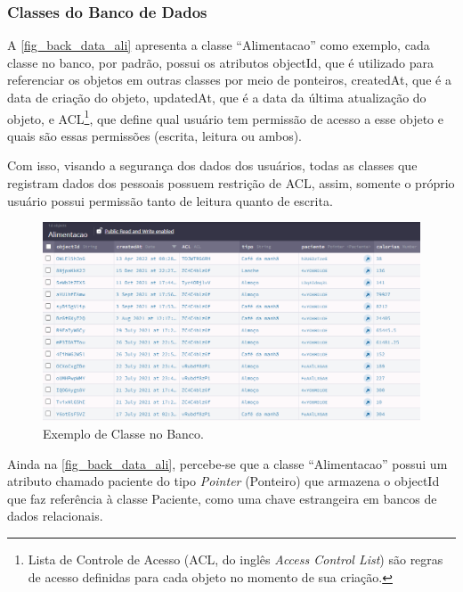 \subsubsection{Classes do Banco de Dados}

A \autoref{fig_back_data_ali} apresenta a classe ``Alimentacao'' como exemplo, cada classe no banco, por padrão,
possui os atributos objectId, que é utilizado para referenciar os objetos em outras classes por
meio de ponteiros, createdAt, que é a data de criação do objeto, updatedAt, que é a data da última atualização
do objeto, e ACL\footnote{Lista de Controle de Acesso (ACL, do inglês \emph{\textit{Access Control List}})
    são regras de acesso definidas para cada objeto no momento de sua criação.}, que define qual usuário tem permissão de acesso a
esse objeto e quais são essas permissões (escrita, leitura ou ambos).

Com isso, visando a segurança dos dados dos usuários, todas as classes que registram dados dos pessoais
possuem restrição de ACL, assim, somente o próprio usuário possui permissão tanto de leitura quanto de escrita.

\begin{figure}[htb]
    \caption{\label{fig_back_data_ali}Exemplo de Classe no Banco.}
    \begin{center}
        \includegraphics[scale=0.63]{Imagens/desenvolvimento/back4app_database_alimentacao.png}
    \end{center}
\end{figure}

Ainda na \autoref{fig_back_data_ali}, percebe-se que a classe ``Alimentacao'' possui um atributo chamado paciente do tipo
\emph{Pointer} (Ponteiro) que armazena o objectId que faz referência à classe Paciente, como uma chave estrangeira em
bancos de dados relacionais.

